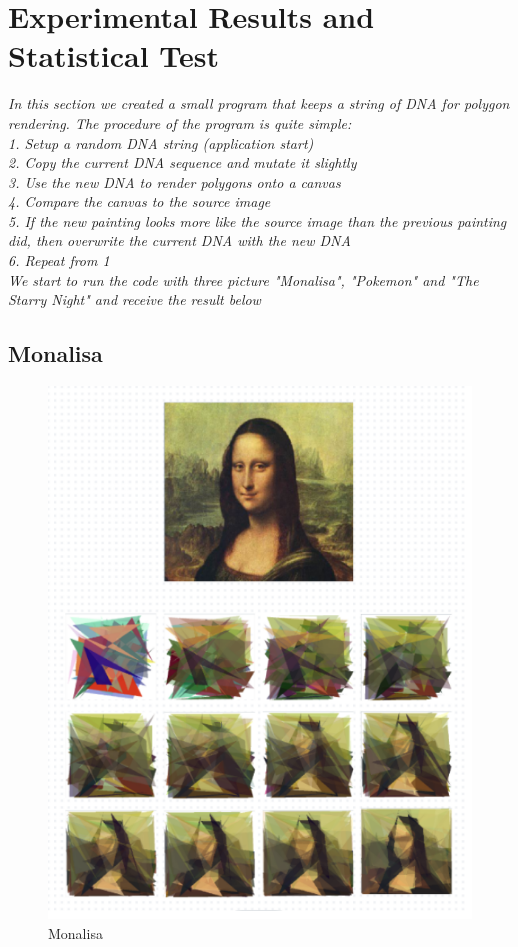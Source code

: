 \chapter{Experimental Results and Statistical Test}
\label{experimental-results-and-statistical-test}

\textit{
In this section we created a small program that keeps a string of DNA for polygon rendering.
The procedure of the program is quite simple:\\
1. Setup a random DNA string  (application start)\\
2. Copy the current DNA sequence and mutate it slightly\\
3. Use the new DNA to render polygons onto a canvas\\
4. Compare the canvas to the source image\\
5. If the new painting looks more like the source image than the previous painting did, then overwrite the current DNA with the new DNA\\
6. Repeat from 1\\

We start to run the code with three picture "Monalisa", "Pokemon" and "The Starry Night" and receive the result below
} 
\clearpage

\section{Monalisa}
\begin{figure}
\centering
\includegraphics[width=4.5in]{images/7a 1.png}
\caption{Monalisa}
\end{figure}
\clearpage

